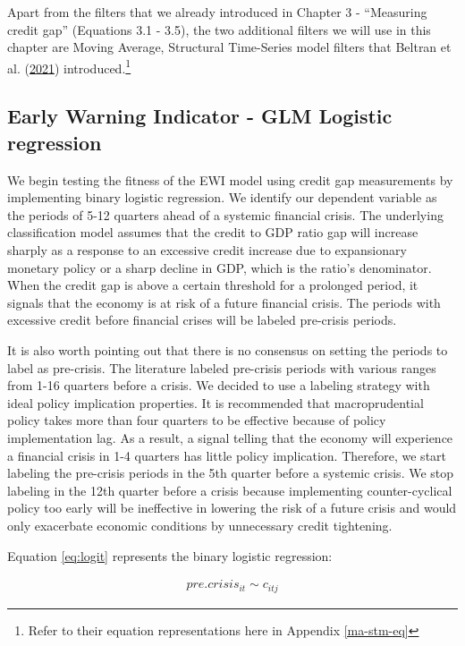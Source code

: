 \documentclass[
  12pt,
]{article}
\begin{document}
Apart from the filters that we already introduced in Chapter 3 - ``Measuring credit gap'' (Equations 3.1 - 3.5), the two additional filters we will use in this chapter are Moving Average, Structural Time-Series model filters that Beltran et al. (\protect\hyperlink{ref-beltran_optimizing_2021}{2021}) introduced.\footnote{Refer to their equation representations here in Appendix \ref{ma-stm-eq}}

\hypertarget{logistic-regression}{%
\subsection{Early Warning Indicator - GLM Logistic regression}\label{logistic-regression}}

We begin testing the fitness of the EWI model using credit gap measurements by implementing binary logistic regression. We identify our dependent variable as the periods of 5-12 quarters ahead of a systemic financial crisis. The underlying classification model assumes that the credit to GDP ratio gap will increase sharply as a response to an excessive credit increase due to expansionary monetary policy or a sharp decline in GDP, which is the ratio's denominator. When the credit gap is above a certain threshold for a prolonged period, it signals that the economy is at risk of a future financial crisis. The periods with excessive credit before financial crises will be labeled pre-crisis periods.

It is also worth pointing out that there is no consensus on setting the periods to label as pre-crisis. The literature labeled pre-crisis periods with various ranges from 1-16 quarters before a crisis. We decided to use a labeling strategy with ideal policy implication properties. It is recommended that macroprudential policy takes more than four quarters to be effective because of policy implementation lag. As a result, a signal telling that the economy will experience a financial crisis in 1-4 quarters has little policy implication. Therefore, we start labeling the pre-crisis periods in the 5th quarter before a systemic crisis. We stop labeling in the 12th quarter before a crisis because implementing counter-cyclical policy too early will be ineffective in lowering the risk of a future crisis and would only exacerbate economic conditions by unnecessary credit tightening.

Equation \eqref{eq:logit} represents the binary logistic regression:

\begin{align} \label{eq:logit}
  pre.crisis_{it} \sim c_{itj} 
\end{align}
\end{document}
